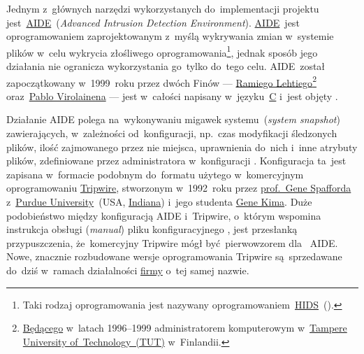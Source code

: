 \documentclass[thesis]{subfiles}
\begin{document}
Jednym z~głównych narzędzi wykorzystanych do~implementacji projektu jest~\href{http://aide.sourceforge.net/}{AIDE}~(\emph{Advanced Intrusion Detection Environment}). \href{https://wiki.archlinux.org/index.php/AIDE}{AIDE}~jest oprogramowaniem zaprojektowanym z~myślą wykrywania zmian w~systemie plików w~celu wykrycia złośliwego oprogramowania\footnote{Taki rodzaj oprogramowania jest nazywany oprogramowaniem~\href{https://en.wikipedia.org/wiki/Host-based_intrusion_detection_system_comparison}{HIDS}~().}, jednak sposób jego działania nie ogranicza wykorzystania go~tylko do~tego celu. AIDE~został zapoczątkowany w~1999~roku przez dwóch Finów --- \href{http://www.ipi.fi/~rammer/cv.html}{Ramiego Lehtiego}\footnote{\href{http://www.ipi.fi/~rammer/cv.html}{Będącego} w~latach 1996--1999 administratorem komputerowym w~\href{http://www.tut.fi/en}{Tampere University of~Technology~(TUT)} w~Finlandii.} oraz~\href{https://www.linkedin.com/in/pablo-virolainen-73501731/}{Pablo Virolainena} --- jest w~całości napisany w~języku~\href{https://en.wikipedia.org/wiki/C_(programming_language)}{C} i~jest objęty .

Działanie AIDE polega na~wykonywaniu migawek systemu~(\emph{system snapshot}) zawierających, w~zależności od~konfiguracji, np.~czas modyfikacji śledzonych plików, ilość zajmowanego przez nie miejsca, uprawnienia do~nich i~inne atrybuty plików, zdefiniowane przez administratora w~konfiguracji \href{https://linux.die.net/man/5/aide.conf}{}. Konfiguracja ta~jest zapisana w~formacie podobnym do~formatu użytego w~komercyjnym oprogramowaniu \href{https://en.wikipedia.org/wiki/Open_Source_Tripwire}{Tripwire}, stworzonym w~1992~roku przez \href{https://en.wikipedia.org/wiki/Gene_Spafford}{prof.~Gene Spafforda} z~\href{https://en.wikipedia.org/wiki/Purdue_University}{Purdue University}~(USA, \href{https://en.wikipedia.org/wiki/Indiana}{Indiana}) i~jego studenta \href{https://en.wikipedia.org/wiki/Gene_Kim}{Gene Kima}. Duże podobieństwo między konfiguracją AIDE i~Tripwire, o~którym wspomina instrukcja obsługi (\emph{\gls{manual}}) pliku konfiguracyjnego , jest przesłanką przypuszczenia, że~komercyjny Tripwire mógł być~pierwowzorem dla~ AIDE. Nowe, znacznie rozbudowane wersje oprogramowania Tripwire są~sprzedawane do~dziś w~ramach działalności \href{https://en.wikipedia.org/wiki/Tripwire_(company)}{firmy} o~tej samej nazwie.
\end{document}
